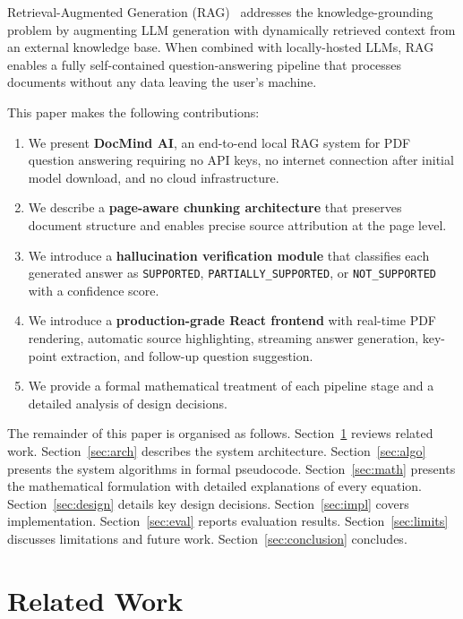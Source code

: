 \documentclass[conference]{IEEEtran}
\begin{document}
Retrieval-Augmented Generation (RAG)~\cite{lewis2020rag} addresses the
knowledge-grounding problem by augmenting LLM generation with dynamically
retrieved context from an external knowledge base.
When combined with locally-hosted LLMs, RAG enables a fully
self-contained question-answering pipeline that processes documents
without any data leaving the user's machine.

This paper makes the following contributions:
\begin{enumerate}
  \item We present \textbf{DocMind AI}, an end-to-end local RAG system
        for PDF question answering requiring no API keys, no internet
        connection after initial model download, and no cloud
        infrastructure.
  \item We describe a \textbf{page-aware chunking architecture} that
        preserves document structure and enables precise source
        attribution at the page level.
  \item We introduce a \textbf{hallucination verification module} that
        classifies each generated answer as \texttt{SUPPORTED},
        \texttt{PARTIALLY\_SUPPORTED}, or \texttt{NOT\_SUPPORTED} with a
        confidence score.
  \item We introduce a \textbf{production-grade React frontend} with
        real-time PDF rendering, automatic source highlighting, streaming
        answer generation, key-point extraction, and follow-up question
        suggestion.
  \item We provide a formal mathematical treatment of each pipeline stage
        and a detailed analysis of design decisions.
\end{enumerate}

The remainder of this paper is organised as follows.
Section~\ref{sec:related} reviews related work.
Section~\ref{sec:arch} describes the system architecture.
Section~\ref{sec:algo} presents the system algorithms in formal pseudocode.
Section~\ref{sec:math} presents the mathematical formulation with
detailed explanations of every equation.
Section~\ref{sec:design} details key design decisions.
Section~\ref{sec:impl} covers implementation.
Section~\ref{sec:eval} reports evaluation results.
Section~\ref{sec:limits} discusses limitations and future work.
Section~\ref{sec:conclusion} concludes.

\section{Related Work}
\label{sec:related}
\end{document}
